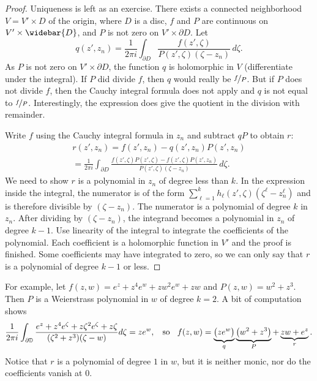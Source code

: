 \documentclass[12pt,openany]{book}
\newcommand{\D}{{\mathbb{D}}}
\theoremstyle{plain}
\theoremstyle{remark}
\theoremstyle{definition}
\theoremstyle{exercise}
\theoremstyle{example}
\begin{document}
\begin{proof}
Uniqueness is left as an exercise.  There exists
a connected neighborhood $V = V' \times D$ of the origin, where
$D$ is a disc,
$f$ and $P$ are continuous on $V' \times \widebar{D}$,
and $P$ is not zero on $V' \times \partial D$.
Let
\begin{equation*}
q(z',z_n) =
\frac{1}{2\pi i} \int_{\partial D} \frac{f(z',\zeta)}{P(z',\zeta)(\zeta-z_n)}
\,d\zeta .
\end{equation*}
As $P$ is not zero on $V' \times \partial D$,
the function $q$
is holomorphic in $V$ (differentiate under the integral).
If $P$ did divide $f$, then $q$ would really be $\nicefrac{f}{P}$.
But if $P$ does not divide $f$, then
the Cauchy integral formula does not apply and $q$ is not equal to
$\nicefrac{f}{P}$.  Interestingly,
the expression does give the quotient in the division with remainder.

Write $f$ using the Cauchy integral formula in $z_n$ and
subtract $qP$ to obtain $r$:
\begin{multline*}
r(z',z_n) = f(z',z_n) - q(z',z_n)P(z',z_n)
\\
=
\frac{1}{2\pi i}
\int_{\partial D} \frac{f(z',\zeta)P(z',\zeta) - f(z',\zeta)P(z',z_n)}{P(z',\zeta)(\zeta-z_n)}
\,d\zeta .
\end{multline*}
We need to show $r$ is a polynomial in $z_n$ of degree less than
$k$.  In the expression inside the integral, the numerator is
of the form $\sum_{\ell=1}^k h_\ell(z',\zeta)(\zeta^\ell-z_n^\ell)$ and is therefore
divisible by $(\zeta-z_n)$.
The numerator is a polynomial of degree $k$ in
$z_n$.  After dividing by $(\zeta-z_n)$,
the integrand becomes
a polynomial in $z_n$ of degree $k-1$.
Use linearity of the integral
to integrate the coefficients of the polynomial.  Each coefficient is a
holomorphic function in $V'$ and the proof is finished.  Some coefficients may have
integrated to zero, so we can only say that $r$ is a polynomial
of degree $k-1$ or less.
\end{proof}

For example, let $f(z,w) = e^z + z^4 e^w + z w^2 e^w + zw$ and $P(z,w)
= w^2 + z^3$.  Then $P$ is a Weierstrass polynomial in $w$ of degree $k=2$.  A bit
of computation shows
\begin{equation*}
\frac{1}{2\pi i}
\int_{\partial \D}
\frac{e^z + z^4 e^{\zeta} + z {\zeta}^2 e^{\zeta} + z \zeta}{(\zeta^2+z^3)(\zeta-w)}
d\zeta
=
z e^w
,
\hspace{0.9em} \text{so} \hspace{0.9em}
f(z,w) = \underbrace{\bigl( ze^w \bigr)}_{q} \underbrace{\bigl( w^2 + z^3 \bigr)}_{P} +
\underbrace{z w + e^z}_{r} .
\end{equation*}
Notice that $r$ is a polynomial of degree $1$ in $w$, but it is neither monic,
nor do the coefficients vanish at $0$.
\end{document}
